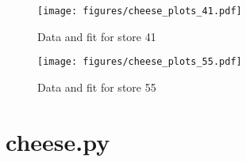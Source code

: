 \documentclass[11pt]{article}
\begin{document}
    \begin{figure}[ht] 
      \centering 
      \texttt{[image: figures/cheese\_plots\_41.pdf]}
      \vskip-10pt
      \caption{\label{fig:cheese_41} Data and fit for store 41}
    \end{figure}

    \begin{figure}[ht] 
      \centering 
      \texttt{[image: figures/cheese\_plots\_55.pdf]}
      \vskip-10pt
      \caption{\label{fig:cheese_55} Data and fit for store 55}
    \end{figure}

    \clearpage

    \appendix

    \section*{cheese.py}
\end{document}
